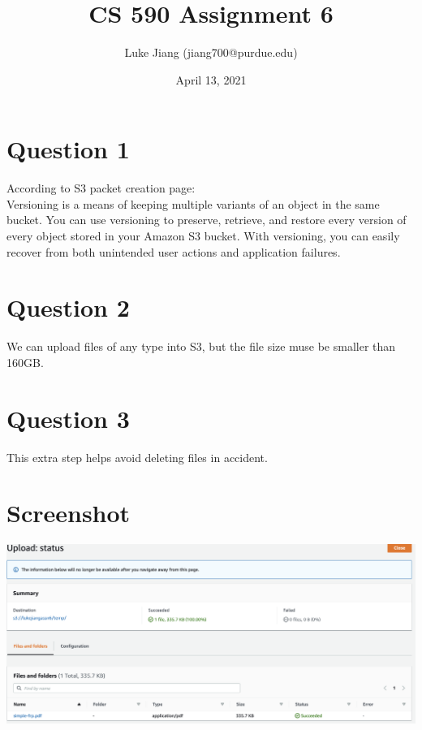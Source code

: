 \documentclass{article}
\title{CS 590 Assignment 6}
\author{Luke Jiang (jiang700@purdue.edu) }
\date{April 13, 2021}
\begin{document}
\maketitle

\section{Question 1}
According to S3 packet creation page:\\
Versioning is a means of keeping multiple variants of an object in the same bucket. You can use versioning to preserve, retrieve, and restore every version of every object stored in your Amazon S3 bucket. With versioning, you can easily recover from both unintended user actions and application failures.

\section{Question 2}
We can upload files of any type into S3, but the file size muse be smaller than 160GB.

\section{Question 3}
This extra step helps avoid deleting files in accident.

\section{Screenshot}
\includegraphics[scale=0.33]{ass6-1.png}
\end{document}
